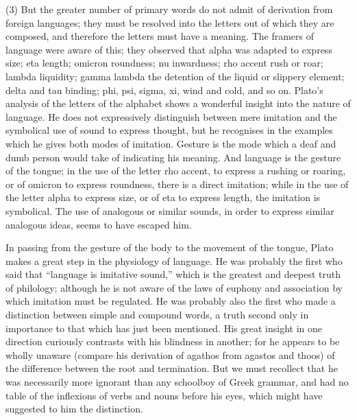 \documentclass[11pt,letter]{article}
\begin{document}
\par  (3) But the greater number of primary words do not admit of derivation from foreign languages; they must be resolved into the letters out of which they are composed, and therefore the letters must have a meaning. The framers of language were aware of this; they observed that alpha was adapted to express size; eta length; omicron roundness; nu inwardness; rho accent rush or roar; lambda liquidity; gamma lambda the detention of the liquid or slippery element; delta and tau binding; phi, psi, sigma, xi, wind and cold, and so on. Plato’s analysis of the letters of the alphabet shows a wonderful insight into the nature of language. He does not expressively distinguish between mere imitation and the symbolical use of sound to express thought, but he recognises in the examples which he gives both modes of imitation. Gesture is the mode which a deaf and dumb person would take of indicating his meaning. And language is the gesture of the tongue; in the use of the letter rho accent, to express a rushing or roaring, or of omicron to express roundness, there is a direct imitation; while in the use of the letter alpha to express size, or of eta to express length, the imitation is symbolical. The use of analogous or similar sounds, in order to express similar analogous ideas, seems to have escaped him.

\par  In passing from the gesture of the body to the movement of the tongue, Plato makes a great step in the physiology of language. He was probably the first who said that “language is imitative sound,” which is the greatest and deepest truth of philology; although he is not aware of the laws of euphony and association by which imitation must be regulated. He was probably also the first who made a distinction between simple and compound words, a truth second only in importance to that which has just been mentioned. His great insight in one direction curiously contrasts with his blindness in another; for he appears to be wholly unaware (compare his derivation of agathos from agastos and thoos) of the difference between the root and termination. But we must recollect that he was necessarily more ignorant than any schoolboy of Greek grammar, and had no table of the inflexions of verbs and nouns before his eyes, which might have suggested to him the distinction.
\end{document}
